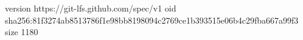 version https://git-lfs.github.com/spec/v1
oid sha256:81f3274ab8513786f1e98bb8198094c2769ce1b393515e06b4c29fba667a99f3
size 1180
